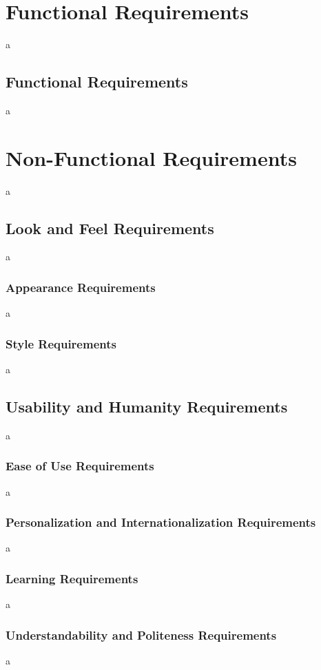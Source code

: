 \documentclass[12pt]{article}
\begin{document}
\section{Functional Requirements}
a

\subsection{Functional Requirements}
a

\section{Non-Functional Requirements}
a

\subsection{Look and Feel Requirements}
a

\subsubsection{Appearance Requirements}
a

\subsubsection{Style Requirements}
a

\subsection{Usability and Humanity Requirements}
a

\subsubsection{Ease of Use Requirements}
a

\subsubsection{Personalization and Internationalization Requirements}
a

\subsubsection{Learning Requirements}
a

\subsubsection{Understandability and Politeness Requirements}
a
\end{document}
